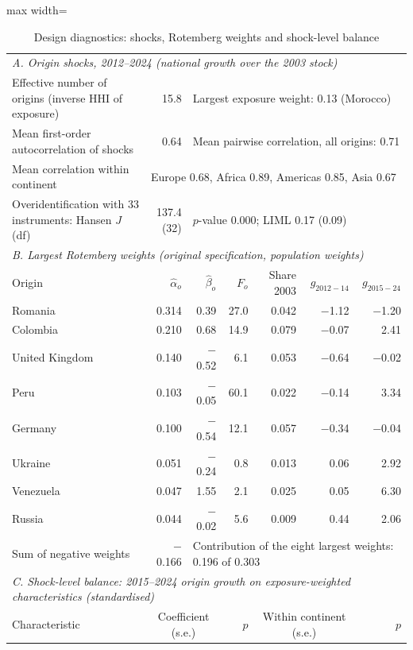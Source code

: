 \begin{table}[!htbp]\centering\small
\caption{Design diagnostics: shocks, Rotemberg weights and shock-level balance}\label{tab:design}
\begin{adjustbox}{max width=\linewidth}\begin{tabular}{lrrrrrr}\toprule
\multicolumn{7}{l}{\textit{A. Origin shocks, 2012--2024 (national growth over the 2003 stock)}}\\
Effective number of origins (inverse HHI of exposure) & 15.8 & \multicolumn{5}{l}{Largest exposure weight: 0.13 (Morocco)}\\
Mean first-order autocorrelation of shocks & 0.64 & \multicolumn{5}{l}{Mean pairwise correlation, all origins: 0.71}\\
Mean correlation within continent & \multicolumn{6}{l}{Europe 0.68, Africa 0.89, Americas 0.85, Asia 0.67}\\
Overidentification with 33 instruments: Hansen $J$ (df) & 137.4 (32) & \multicolumn{5}{l}{$p$-value 0.000; LIML 0.17 (0.09)}\\
\midrule\multicolumn{7}{l}{\textit{B. Largest Rotemberg weights (original specification, population weights)}}\\
Origin & $\hat\alpha_o$ & $\hat\beta_o$ & $F_o$ & Share 2003 & $g_{2012-14}$ & $g_{2015-24}$\\
Romania & 0.314 & 0.39 & 27.0 & 0.042 & $-$1.12 & $-$1.20\\
Colombia & 0.210 & 0.68 & 14.9 & 0.079 & $-$0.07 & 2.41\\
United Kingdom & 0.140 & $-$0.52 & 6.1 & 0.053 & $-$0.64 & $-$0.02\\
Peru & 0.103 & $-$0.05 & 60.1 & 0.022 & $-$0.14 & 3.34\\
Germany & 0.100 & $-$0.54 & 12.1 & 0.057 & $-$0.34 & $-$0.04\\
Ukraine & 0.051 & $-$0.24 & 0.8 & 0.013 & 0.06 & 2.92\\
Venezuela & 0.047 & 1.55 & 2.1 & 0.025 & 0.05 & 6.30\\
Russia & 0.044 & $-$0.02 & 5.6 & 0.009 & 0.44 & 2.06\\
Sum of negative weights & $-$0.166 & \multicolumn{5}{l}{Contribution of the eight largest weights: 0.196 of 0.303}\\
\midrule\multicolumn{7}{l}{\textit{C. Shock-level balance: 2015--2024 origin growth on exposure-weighted characteristics (standardised)}}\\
Characteristic & \multicolumn{2}{c}{Coefficient (s.e.)} & $p$ & \multicolumn{2}{c}{Within continent (s.e.)} & $p$\\

\end{tabular}
\end{adjustbox}
\end{table}
